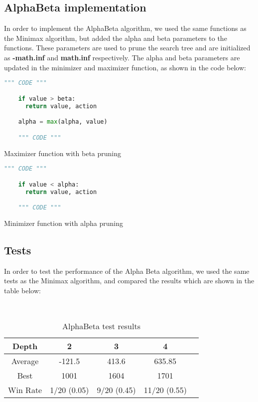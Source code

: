 \documentclass{article}
\begin{document}
\subsection{AlphaBeta implementation}

In order to implement the AlphaBeta algorithm, we used the same functions as the Minimax algorithm, but added the alpha and beta parameters to the functions. These parameters are used to prune the search tree and are initialized as \textbf{-math.inf} and \textbf{math.inf} respectively. The alpha and beta parameters are updated in the minimizer and maximizer function, as shown in the code below:

\begin{table}[!ht]
  \begin{lstlisting}[language=python, frame=tlbr, framesep=6pt, backgroundcolor=\color{light-gray}]
    """ CODE """

    if value > beta:
      return value, action

    alpha = max(alpha, value)

    """ CODE """
  \end{lstlisting}
  \caption{Maximizer function with beta pruning}
\end{table}

\begin{table}[!ht]
  \begin{lstlisting}[language=python, frame=tlbr, framesep=6pt, backgroundcolor=\color{light-gray}]
    """ CODE """

    if value < alpha:
      return value, action

    """ CODE """
  \end{lstlisting}
  \caption{Minimizer function with alpha pruning}
\end{table}

\subsection{Tests}

In order to test the performance of the Alpha Beta algorithm, we used the same tests as the Minimax algorithm, and compared the results which are shown in the table below:

~\\
\begin{table}[!ht]
  \begin{center}
    \begin{tabular}{||c||c|c|c|c||}
      \hline
      Depth & 2 & 3 & 4 \\
      \hline\hline
      Average &  -121.5 &  413.6 &  635.85 \\
      \hline\hline
      Best & 1001 & 1604 & 1701 \\
      \hline\hline
      Win Rate & 1/20 (0.05) & 9/20 (0.45) & 11/20 (0.55) \\
      \hline
    \end{tabular}
    \caption{AlphaBeta test results}
    \label{tab:alphabeta}
  \end{center}
\end{table}
\end{document}
